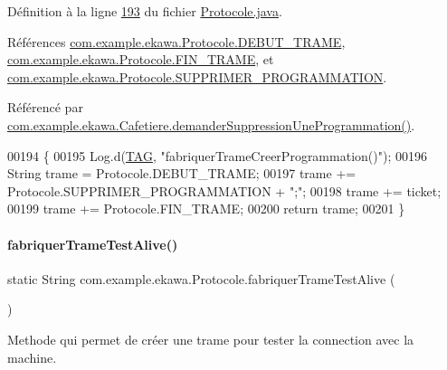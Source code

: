 Définition à la ligne \hyperlink{_protocole_8java_source_l00193}{193} du fichier \hyperlink{_protocole_8java_source}{Protocole.\+java}.



Références \hyperlink{_protocole_8java_source_l00025}{com.\+example.\+ekawa.\+Protocole.\+D\+E\+B\+U\+T\+\_\+\+T\+R\+A\+ME}, \hyperlink{_protocole_8java_source_l00026}{com.\+example.\+ekawa.\+Protocole.\+F\+I\+N\+\_\+\+T\+R\+A\+ME}, et \hyperlink{_protocole_8java_source_l00033}{com.\+example.\+ekawa.\+Protocole.\+S\+U\+P\+P\+R\+I\+M\+E\+R\+\_\+\+P\+R\+O\+G\+R\+A\+M\+M\+A\+T\+I\+ON}.



Référencé par \hyperlink{_cafetiere_8java_source_l00793}{com.\+example.\+ekawa.\+Cafetiere.\+demander\+Suppression\+Une\+Programmation()}.


\begin{DoxyCode}
00194     \{
00195         Log.d(\hyperlink{classcom_1_1example_1_1ekawa_1_1_protocole_ae9b68fa0daac528421b887f19413f8f5}{TAG}, \textcolor{stringliteral}{"fabriquerTrameCreerProgrammation()"});
00196         String trame = Protocole.DEBUT\_TRAME;
00197         trame += Protocole.SUPPRIMER\_PROGRAMMATION + \textcolor{stringliteral}{";"};
00198         trame += ticket;
00199         trame += Protocole.FIN\_TRAME;
00200         \textcolor{keywordflow}{return} trame;
00201     \}
\end{DoxyCode}
\mbox{\label{classcom_1_1example_1_1ekawa_1_1_protocole_a6a93842b8987e56582d83c778305840a}} 
\paragraph{\texorpdfstring{fabriquer\+Trame\+Test\+Alive()}{fabriquerTrameTestAlive()}}
{\footnotesize\ttfamily static String com.\+example.\+ekawa.\+Protocole.\+fabriquer\+Trame\+Test\+Alive (\begin{DoxyParamCaption}{ }\end{DoxyParamCaption})\hspace{0.3cm}{\ttfamily [static]}}



Methode qui permet de créer une trame pour tester la connection avec la machine. 

